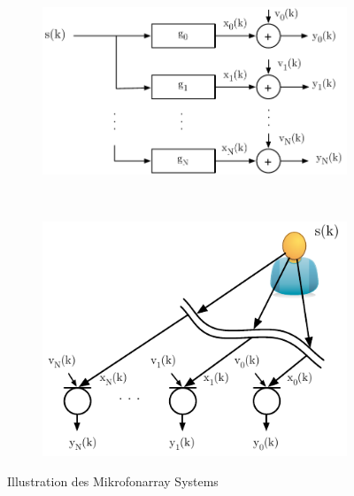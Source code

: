 \begin{figure}
        \centering
        \begin{subfigure}[b]{0.48\textwidth}
                \centering
                \includegraphics[width=\textwidth]{grafiken/02_Konzeptionierung/IllustrationMikrofonarraySystem_a}
                \caption{}
                \label{fig:IllustrationMikrofonarraySystems_a}
        \end{subfigure}
        ~ %
        \begin{subfigure}[b]{0.48\textwidth}
                \centering
                \includegraphics[width=\textwidth]{grafiken/02_Konzeptionierung/IllustrationMikrofonarraySystem_b}
                \caption{}
                \label{fig:IllustrationMikrofonarraySystems_b}
        \end{subfigure}
        \caption{Illustration des Mikrofonarray Systems}
\end{figure}

